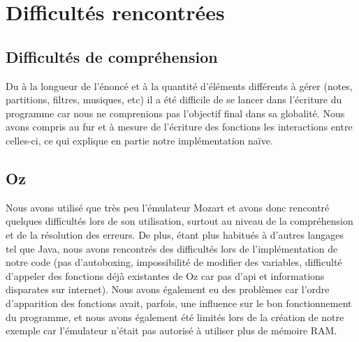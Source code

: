 \documentclass[a4paper,10pt]{article}
\begin{document}
\section{Difficultés rencontrées}

\subsection{Difficultés de compréhension}
Du à la longueur de l'énoncé et à la quantité d'éléments différents à gérer (notes, partitions, filtres, musiques, etc)  il a été difficile de se
lancer dans l'écriture du programme car nous ne comprenions pas l'objectif final dans sa globalité. Nous avons compris au fur et à mesure de 
l'écriture des fonctions les interactions entre celles-ci, ce qui explique en partie notre implémentation naïve. 

\subsection{Oz}
Nous avons utilisé que très peu l'émulateur Mozart et avons donc rencontré quelques difficultés lors de son utilisation, surtout au niveau de la 
compréhension et de la résolution des erreurs. De plus, étant plus habitués à d'autres langages tel que Java, nous avons rencontrés des 
difficultés lors de l'implémentation de notre code (pas d'autoboxing, impossibilité de modifier des variables, difficulté d'appeler des fonctions
déjà existantes de Oz car pas d'api et informations disparates sur internet). Nous avons également eu des problèmes car l'ordre d'apparition des 
fonctions avait, parfois, une influence sur le bon fonctionnement du programme, et nous avons également été limités lors de la création de notre
exemple car l'émulateur n'était pas autorisé à utiliser plus de mémoire RAM.
\end{document}
